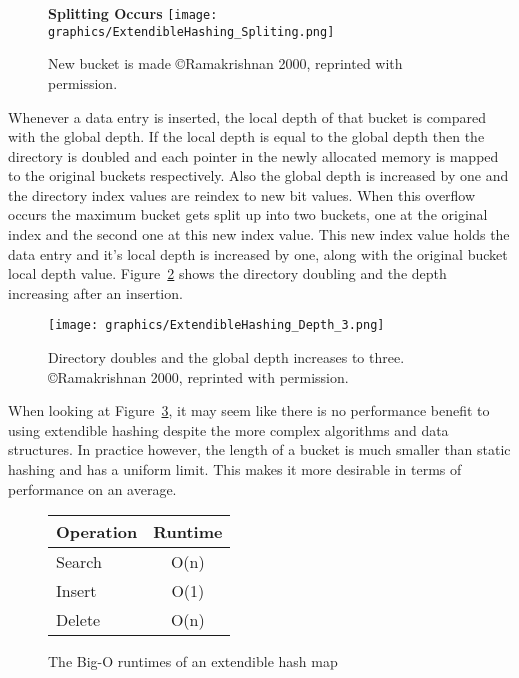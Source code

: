 \documentclass[letterpaper, 11pt]{article}
\begin{document}
\begin{figure}[H]
  \centering
  \textbf{Splitting Occurs}
  \texttt{[image: graphics/ExtendibleHashing\_Spliting.png]}
  \caption{New bucket is made \copyright Ramakrishnan 2000, reprinted with permission.\cite{ramakrishnan2000database}}
  \label{fig:ext_hash_split}
\end{figure}

Whenever a data entry is inserted, the local depth of that bucket is compared with the global depth. If the local depth
is equal to the global depth then the directory is doubled and each pointer in the newly allocated memory is mapped to the
original buckets respectively. Also the global depth is increased by one and the directory index values are reindex to new
bit values. When this overflow occurs the maximum bucket gets split up into two buckets, one at the original index and the
second one at this new index value. This new index value holds the data entry and it's local depth is increased by one, along with
the original bucket local depth value. Figure~\ref{fig:ext_hash_dir_dbl} shows the directory doubling and the depth increasing
after an insertion.
\par\vspace{\baselineskip}

\begin{figure}
  \centering
  \texttt{[image: graphics/ExtendibleHashing\_Depth\_3.png]}
  \caption{Directory doubles and the global depth increases to three. \copyright Ramakrishnan 2000, reprinted with permission.\cite{ramakrishnan2000database}}
  \label{fig:ext_hash_dir_dbl}
\end{figure}

When looking at Figure~\ref{fig:ext_hash_runtimes}, it may seem like there is no performance 
benefit to using extendible hashing despite the more complex algorithms and data structures. 
In practice however, the length of a bucket is much smaller than static hashing and has
a uniform limit. This makes it more desirable in terms of performance on an average.
\par\vspace{\baselineskip}

\begin{figure}[H]
\centering
\begin{tabular}{l | c }
  \hline
  Operation & Runtime \\ \hline \hline
  Search & O(n) \\ \hline
  Insert & O(1) \\ \hline
  Delete & O(n) \\ \hline
\end{tabular}
\caption{The Big-O runtimes of an extendible hash map}
\label{fig:ext_hash_runtimes}
\end{figure}
\end{document}
